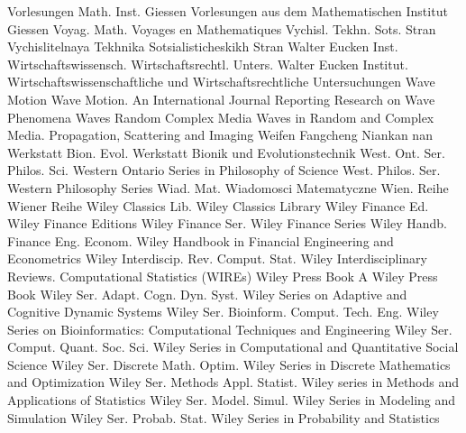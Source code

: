 {Vorlesungen Math. Inst. Giessen}
{Vorlesungen aus dem Mathematischen Institut Giessen}
{Voyag. Math.}
{Voyages en Mathematiques}
{Vychisl. Tekhn. Sots. Stran}
{Vychislitelnaya Tekhnika Sotsialisticheskikh Stran}
{Walter Eucken Inst. Wirtschaftswissensch. Wirtschaftsrechtl. Unters.}
{Walter Eucken Institut. Wirtschaftswissenschaftliche und Wirtschaftsrechtliche Untersuchungen}
{Wave Motion}
{Wave Motion. An International Journal Reporting Research on Wave Phenomena}
{Waves Random Complex Media}
{Waves in Random and Complex Media. Propagation, Scattering and Imaging}
{Weifen Fangcheng Niankan}
{nan}
{Werkstatt Bion. Evol.}
{Werkstatt Bionik und Evolutionstechnik}
{West. Ont. Ser. Philos. Sci.}
{Western Ontario Series in Philosophy of Science}
{West. Philos. Ser.}
{Western Philosophy Series}
{Wiad. Mat.}
{Wiadomosci Matematyczne}
{Wien. Reihe}
{Wiener Reihe}
{Wiley Classics Lib.}
{Wiley Classics Library}
{Wiley Finance Ed.}
{Wiley Finance Editions}
{Wiley Finance Ser.}
{Wiley Finance Series}
{Wiley Handb. Finance Eng. Econom.}
{Wiley Handbook in Financial Engineering and Econometrics}
{Wiley Interdiscip. Rev. Comput. Stat.}
{Wiley Interdisciplinary Reviews. Computational Statistics (WIREs)}
{Wiley Press Book}
{A Wiley Press Book}
{Wiley Ser. Adapt. Cogn. Dyn. Syst.}
{Wiley Series on Adaptive and Cognitive Dynamic Systems}
{Wiley Ser. Bioinform. Comput. Tech. Eng.}
{Wiley Series on Bioinformatics: Computational Techniques and Engineering}
{Wiley Ser. Comput. Quant. Soc. Sci.}
{Wiley Series in Computational and Quantitative Social Science}
{Wiley Ser. Discrete Math. Optim.}
{Wiley Series in Discrete Mathematics and Optimization}
{Wiley Ser. Methods Appl. Statist.}
{Wiley series in Methods and Applications of Statistics}
{Wiley Ser. Model. Simul.}
{Wiley Series in Modeling and Simulation}
{Wiley Ser. Probab. Stat.}
{Wiley Series in Probability and Statistics}
